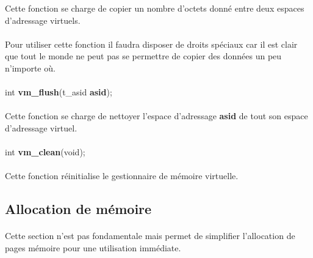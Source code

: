 \documentclass[10pt,a4wide]{article}
\begin{document}
Cette fonction se charge de copier un nombre d'octets donn\'e entre
deux espaces d'adressage virtuels.

\paragraph{}

Pour utiliser cette fonction il faudra disposer de droits sp\'eciaux
car il est clair que tout le monde ne peut pas se permettre de copier
des donn\'ees un peu n'importe o\`u.

\paragraph{}

\hspace{1.5cm}int \textbf{vm\_flush}(t\_asid \textbf{asid});

\paragraph{}

Cette fonction se charge de nettoyer l'espace d'adressage \textbf{asid}
de tout son espace d'adressage virtuel.

\paragraph{}

\hspace{1.5cm}int \textbf{vm\_clean}(void);

\paragraph{}

Cette fonction r\'einitialise le gestionnaire de m\'emoire virtuelle.

\subsection{Allocation de m\'emoire}

\paragraph{}

Cette section n'est pas fondamentale mais permet de simplifier l'allocation
de pages m\'emoire pour une utilisation imm\'ediate.

\paragraph{}
\end{document}

